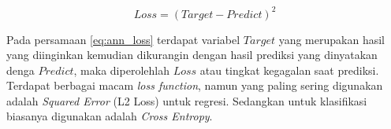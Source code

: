 \begin{equation}\label{eq:ann_loss}
Loss = (Target - Predict)^{2}
\end{equation}

Pada persamaan \ref{eq:ann_loss} terdapat variabel $Target$ yang merupakan hasil yang diinginkan kemudian dikurangin dengan hasil prediksi yang dinyatakan denga $Predict$, maka diperolehlah $Loss$ atau tingkat kegagalan saat prediksi. Terdapat berbagai macam \textit{loss function}, namun yang paling sering digunakan adalah \textit{Squared Error} (L2 Loss) untuk regresi. Sedangkan untuk klasifikasi biasanya digunakan adalah \textit{Cross Entropy}.